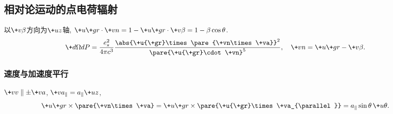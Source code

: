 \documentclass[hidelinks]{ctexart}
\begin{document}
\subsection{相对论运动的点电荷辐射} %
\label{sub:相对论运动的点电荷辐射}

以$\+v\beta$方向为$\+uz$轴, $\+u{\+gr}\cdot \+vn = 1-\+u{\+gr}\cdot \+v\beta = 1-\beta\cos\theta$.
\[ \+d\Omega dP = \frac{e_s^2}{4\pi c^3} \frac{\abs{\+u{\+gr}\times \pare{\+vn\times \+va}}^2}{\pare{\+u{\+gr}\cdot \+vn}^5},\quad \+vn = \+u{\+gr} - \+v\beta. \]

\subsubsection{速度与加速度平行} %
\label{ssub:速度与加速度平行}

$\+vv\parallel \pm \+va$, $\+va_\parallel = a_\parallel \+uz$,
\[ \+u{\+gr}\times\pare{\+vn\times \+va} = \+u{\+gr}\times\pare{\+u{\+gr}\times \+va_{\parallel}} = a_{\parallel} \sin\theta\,\+u\theta. \]
\end{document}
